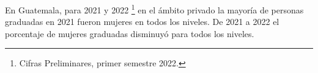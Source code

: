 En Guatemala, para 2021 y 2022 \footnote{Cifras Preliminares, primer semestre 2022.} en el ámbito privado la mayoría de personas graduadas en 2021 fueron mujeres en todos los niveles. De 2021 a 2022 el porcentaje de mujeres graduadas disminuyó para todos los niveles. 